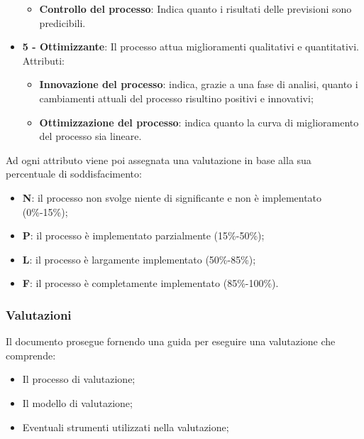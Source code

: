 \documentclass[../norme-di-progetto.tex]{subfiles}
\begin{document}
\begin{itemize}
\begin{itemize}
            \item \textbf{Controllo del processo}: Indica quanto i risultati delle previsioni sono predicibili.
        \end{itemize}
    \item \textbf{5 - Ottimizzante}: Il processo attua miglioramenti qualitativi e quantitativi.
        \\ Attributi:
        \begin{itemize}
            \item \textbf{Innovazione del processo}: indica, grazie a una fase di analisi, quanto i cambiamenti attuali del processo risultino positivi e innovativi;
            \item \textbf{Ottimizzazione del processo}: indica quanto la curva di miglioramento del processo sia lineare.
        \end{itemize}
\end{itemize}

Ad ogni attributo viene poi assegnata una valutazione in base alla sua percentuale di soddisfacimento:

\begin{itemize}
    \item \textbf{N}: il processo non svolge niente di significante e non è implementato (0\%-15\%);
    \item \textbf{P}: il processo è implementato parzialmente (15\%-50\%);
    \item \textbf{L}: il processo è largamente implementato (50\%-85\%);
    \item \textbf{F}: il processo è completamente implementato (85\%-100\%).
\end{itemize}


\subsubsection{Valutazioni}
\label{sub:valutazioni}
Il documento prosegue fornendo una guida per eseguire una valutazione che comprende:
\begin{itemize}
    \item Il processo di valutazione;
    \item Il modello di valutazione;
    \item Eventuali strumenti utilizzati nella valutazione;
\end{itemize}
\end{document}

